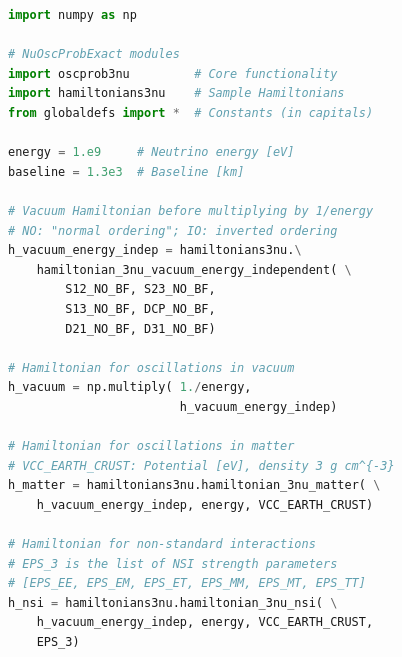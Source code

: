 \documentclass[final,5p,times,twocolumn]{elsarticle}
\providecommand{\DIFaddbegin}{} %
\providecommand{\DIFdelbegin}{} %
\providecommand{\DIFdelend}{} %
\providecommand{\DIFmodbegin}{} %
\begin{document}
\DIFdelbegin %
\DIFdelend \DIFaddbegin \DIFmodbegin
\begin{lstlisting}[language=Python, caption={Code snippet to use {\tt NuOscProbExact} to compute three-neutrino oscillation probabilities in vacuum, matter of constant density, with non-standard interactions, and with CPT-odd Lorentz-violating background, for fixed neutrino energy $E = 1$~GeV and baseline $L = 1300$~km.  Constants --- with variable names in capitals --- are pulled from the {\tt globaldefs} module; see the main text for their values.  The printed output has been regenerated with v1.13.0.  Five of the thirty-six entries changed, each in the last digit: {\tt Pet} in the matter block, and {\tt Pmm}, {\tt Pmt}, {\tt Ptm}, and {\tt Ptt} in the NSI block.  The vacuum and LIV blocks are unchanged.}, label={lst:3nu_examples}, float,alsolanguage=DIFcode]
import numpy as np

# NuOscProbExact modules
import oscprob3nu         # Core functionality
import hamiltonians3nu    # Sample Hamiltonians
from globaldefs import *  # Constants (in capitals)

energy = 1.e9     # Neutrino energy [eV]
baseline = 1.3e3  # Baseline [km]

# Vacuum Hamiltonian before multiplying by 1/energy
# NO: "normal ordering"; IO: inverted ordering
h_vacuum_energy_indep = hamiltonians3nu.\
    hamiltonian_3nu_vacuum_energy_independent( \
        S12_NO_BF, S23_NO_BF,
        S13_NO_BF, DCP_NO_BF,
        D21_NO_BF, D31_NO_BF)

# Hamiltonian for oscillations in vacuum
h_vacuum = np.multiply( 1./energy, 
                        h_vacuum_energy_indep)

# Hamiltonian for oscillations in matter                        
# VCC_EARTH_CRUST: Potential [eV], density 3 g cm^{-3}
h_matter = hamiltonians3nu.hamiltonian_3nu_matter( \
    h_vacuum_energy_indep, energy, VCC_EARTH_CRUST)

# Hamiltonian for non-standard interactions
# EPS_3 is the list of NSI strength parameters
# [EPS_EE, EPS_EM, EPS_ET, EPS_MM, EPS_MT, EPS_TT]
h_nsi = hamiltonians3nu.hamiltonian_3nu_nsi( \
    h_vacuum_energy_indep, energy, VCC_EARTH_CRUST, 
    EPS_3)


\end{lstlisting}
\end{document}
